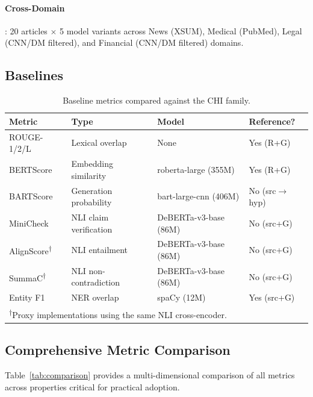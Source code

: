 \documentclass[11pt]{article}
\begin{document}
\paragraph{Cross-Domain}: 20 articles $\times$ 5 model variants across News (XSUM), Medical (PubMed), Legal (CNN/DM filtered), and Financial (CNN/DM filtered) domains.

\subsection{Baselines}

\begin{table}[h]
\centering
\caption{Baseline metrics compared against the CHI family.}
\label{tab:baselines}
\begin{tabular}{llll}
\toprule
\textbf{Metric} & \textbf{Type} & \textbf{Model} & \textbf{Reference?} \\
\midrule
ROUGE-1/2/L & Lexical overlap & None & Yes (R+G) \\
BERTScore & Embedding similarity & roberta-large (355M) & Yes (R+G) \\
BARTScore & Generation probability & bart-large-cnn (406M) & No (src$\to$hyp) \\
MiniCheck & NLI claim verification & DeBERTa-v3-base (86M) & No (src+G) \\
AlignScore\textsuperscript{$\dagger$} & NLI entailment & DeBERTa-v3-base (86M) & No (src+G) \\
SummaC\textsuperscript{$\dagger$} & NLI non-contradiction & DeBERTa-v3-base (86M) & No (src+G) \\
Entity F1 & NER overlap & spaCy (12M) & Yes (src+G) \\
\bottomrule
\multicolumn{4}{l}{\textsuperscript{$\dagger$}Proxy implementations using the same NLI cross-encoder.}
\end{tabular}
\end{table}

\subsection{Comprehensive Metric Comparison}

Table~\ref{tab:comparison} provides a multi-dimensional comparison of all metrics across properties critical for practical adoption.
\end{document}

